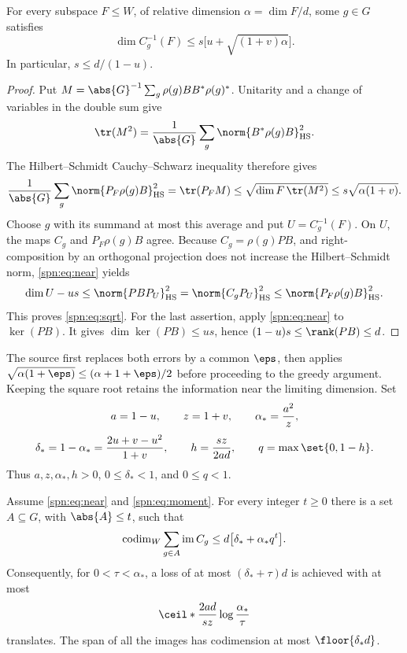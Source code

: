 \begin{lemma}\label{spn:lem:sqrt}
For every subspace $F\le W$, of relative dimension $\alpha=\dim F/d$, some
$g\in G$ satisfies
\begin{equation}\label{spn:eq:sqrt}
 \dim C_g^{-1}(F)\le s\bigl[u+\sqrt{(1+v)\alpha}\bigr].
\end{equation}
In particular, $s\le d/(1-u)$.
\end{lemma}

\begin{proof}
Put $M=\abs{G}^{-1}\sum_g\rho(g)BB^*\rho(g)^*$. Unitarity and a change of
variables in the double sum give
\[
 \tr(M^2)=\frac1{\abs{G}}\sum_g\norm{B^*\rho(g)B}_{\spnHS}^2 .
\]
The Hilbert--Schmidt Cauchy--Schwarz inequality therefore gives
\[
 \frac1{\abs{G}}\sum_g\norm{P_F\rho(g)B}_{\spnHS}^2=\tr(P_FM)
 \le\sqrt{\dim F\,\tr(M^2)}\le s\sqrt{\alpha(1+v)} .
\]
Choose $g$ with its summand at most this average and put $U=C_g^{-1}(F)$. On
$U$, the maps $C_g$ and $P_F\rho(g)B$ agree. Because $C_g=\rho(g)PB$, and
right-composition by an orthogonal projection does not increase the
Hilbert--Schmidt norm, \eqref{spn:eq:near} yields
\[
 \dim U-us\le\norm{PBP_U}_{\spnHS}^2=\norm{C_gP_U}_{\spnHS}^2
 \le\norm{P_F\rho(g)B}_{\spnHS}^2 .
\]
This proves \eqref{spn:eq:sqrt}. For the last assertion, apply
\eqref{spn:eq:near} to $\ker(PB)$. It gives $\dim\ker(PB)\le us$, hence
$(1-u)s\le\rank(PB)\le d$.
\end{proof}

The source first replaces both errors by a common $\eps$, then applies
$\sqrt{\alpha(1+\eps)}\le(\alpha+1+\eps)/2$ before proceeding to the greedy
argument. Keeping the square root retains the information near the limiting
dimension. Set
\begin{equation}\label{spn:eq:parameters}
\begin{gathered}
 a=1-u,\qquad z=1+v,\qquad \alpha_*=\frac{a^2}{z},\\[3pt]
 \delta_*=1-\alpha_*=\frac{2u+v-u^2}{1+v},\qquad h=\frac{sz}{2ad},\qquad
 q=\max\set{0,1-h}.
\end{gathered}
\end{equation}
Thus $a,z,\alpha_*,h>0$, $0\le\delta_*<1$, and $0\le q<1$.

\begin{theorem}\label{spn:thm:greedy}
Assume \eqref{spn:eq:near} and \eqref{spn:eq:moment}. For every integer $t\ge0$
there is a set $A\subseteq G$, with $\abs{A}\le t$, such that
\begin{equation}\label{spn:eq:greedy}
 \operatorname{codim}_W\sum_{g\in A}\operatorname{im} C_g\le d\bigl[\delta_*+\alpha_*q^t\bigr].
\end{equation}
Consequently, for $0<\tau<\alpha_*$, a loss of at most $(\delta_*+\tau)d$ is
achieved with at most
\begin{equation}\label{spn:eq:count}
 \ceil*{\frac{2ad}{sz}\log\frac{\alpha_*}{\tau}}
\end{equation}
translates. The span of all the images has codimension at most
$\floor{\delta_*d}$.
\end{theorem}

